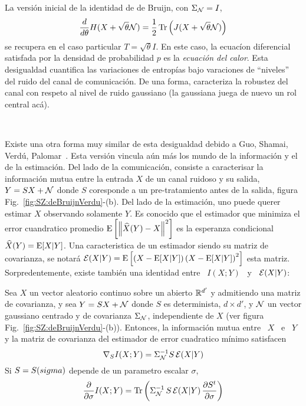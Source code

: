La  versi\'on  inicial  de la  identidad  de  de  Bruijn, con  $\Sigma_{\mathcal{N}}  =
I$,
%
\[
\frac{d}{d\theta}     H(X+\sqrt{\theta}    \mathcal{N})    =     \frac12    \operatorname{Tr}\left(
  J(X+\sqrt{\theta} \mathcal{N}) \right)
\]
%
se  recupera en el  caso particular  $T =  \sqrt{\theta} I$.   En este  caso, la
ecuac\'ion diferencial satisfada por la  densidad de probabilidad $p$ es la {\it
  ecuaci\'on  del  calor}.   Esta  desigualdad  cuantifica  las  variaciones  de
entrop\'ias   bajo   varaciones   de   ``niveles''   del  ruido   del   canal   de
comunicaci\'on. De una  forma, caracteriza la robustez del  canal con respeto al
nivel de ruido gaussiano (la gaussiana juega de nuevo un rol central ac\'a).

\

Existe una  otra forma  muy similar  de esta desigualdad  debido a  Guo, Shamai,
Verd\'u, Palomar~\cite{GuoSha05,  PalVer06}. Esta versi\'on  vincula a\'un m\'as
los  mundo  de la  informaci\'on  y  el de  la  estimaci\'on.   Del  lado de  la
comunicaci\'on, consiste a caracterisar  la informaci\'on mutua entre la entrada
$X$ de un canal  ruidoso y su salida, $Y = S X +  \mathcal{N}$ donde $S$ coresponde a
un       pre-tratamiento       antes       de      la       salida,       figura
Fig.~\ref{fig:SZ:deBruijnVerdu}-(b).   Del lado  de la  estimaci\'on,  uno puede
querer estimar $X$  observando solamente $Y$.  Es conocido  que el estimador que
minimiza el  error cuandratico promedio  $\operatorname{E}\left[ \left\| \widehat{X}(Y)  - X
  \right\|^2   \right]$   es   la   esperanza  condicional   $\widehat{X}(Y)   =
\operatorname{E}[X|Y]$. Una caracteristica  de un estimador siendo su  matriz de covarianza,
se  notar\'a $\mathcal{E}(X|Y)  = \operatorname{E}\left[  \left(  X -  \operatorname{E}[X|Y] \right)  \left( X  -
    \operatorname{E}[X|Y]   \right)^2  \right]$   esta  matriz.    Sorpredentemente,  existe
tambi\'en una identidad entre \ $I(X;Y)$ \ y \ $\mathcal{E}(X|Y)$:
%
\begin{teorema}
  Sea  $X$  un  vector  aleatorio  continuo  sobre  un  abierto  $\mathbb{R}^{d'}$  y
  admitiendo una  matriz de covarianza, y  sea $Y = S  X + \mathcal{N}$  donde $S$ es
  determinista, $d  \times d'$, y $\mathcal{N}$  un vector gaussiano  centrado y de
  covarianza      $\Sigma_{\mathcal{N}}$,      independiente      de      $X$      (ver
  figura Fig.~\ref{fig:SZ:deBruijnVerdu}-(b)). Entonces, la informaci\'on mutua entre
  \ $X$ \  e \ $Y$ y la  matriz de covarianza del estimador  de error cuadratico
  m\'inimo satisfacen
  \[
  \nabla_S I(X;Y) = \Sigma_{\mathcal{N}}^{-1} S \, \mathcal{E}(X|Y)
  \]
  Si     $S    =     S(\\sigma)$    depende     de    un     parametro    escalar
  $\sigma$,
  \[
  \frac{\partial}{\partial \sigma} I(X;Y) = \operatorname{Tr}\left( \Sigma_{\mathcal{N}}^{-1} \, S \,
    \mathcal{E}(X|Y) \, \frac{\partial S^t}{\partial \sigma} \right)
  \]
\end{teorema}
